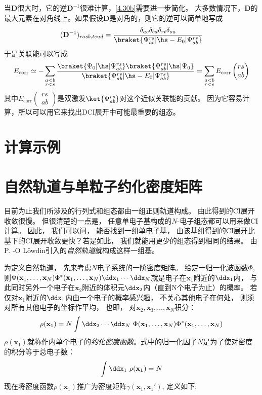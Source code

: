 当$\mathbf{D}$很大时，它的逆$\mathbf{D}^{-1}$很难计算，\autoref{4.30b}需要进一步简化。
大多数情况下，$\mathbf{D}$的最大元素在对角线上。如果假设$\mathbf{D}$是对角的，则它的逆可以简单地写成
\begin{align}
	(\mathbf{D}^{-1})_{rasb, tcud}=\frac{\delta_{ac}\delta_{bd}\delta_{rt}\delta_{su}}{\braket{\Psi^{rs}_{ab}|\hs-E_0|\Psi^{rs}_{ab}}}
\end{align}
于是关联能可以写成
\begin{align}
	E_{\text{corr}}\simeq -\sum_{\substack{a<b\\r<s}}\frac{\braket{\Psi_0|\hs|\Psi^{rs}_{ab}}\braket{\Psi^{rs}_{ab}|\hs|\Psi_0}}{\braket{\Psi^{rs}_{ab}|\hs-E_0|\Psi^{rs}_{ab}}}
	=\sum_{\substack{a<b\\r<s}}E_{\text{corr}}
	\begin{pmatrix}
		rs\\ab
	\end{pmatrix}
\end{align}
其中$E_{\text{corr}}
\begin{pmatrix}
	rs\\ab
\end{pmatrix}$是双激发$\ket{\Psi^{rs}_{ab}}$对这个近似关联能的贡献。
因为它容易计算，所以可以用它来找出DCI展开中可能最重要的组态。
\section{计算示例}\mbox{}
\label{sec4.3}
\section{自然轨道与单粒子约化密度矩阵}
\label{sec4.4}
目前为止我们所涉及的行列式和组态都由一组正则\hft 轨道构成。
由此得到的CI展开收敛很慢。
但很清楚的一点是，
任意单电子基构成的$N$-电子组态都可以用来做CI计算。
因此，
我们可以问，
能否找到一组单电子基，
由该基组得到的CI展开比\hft 基下的CI展开收敛更快？若是如此，
我们就能用更少的组态得到相同的结果。
由P.
-O L\"owdin引入的\emph{自然轨道}就构成这样一组基。


为定义自然轨道，
先来考虑$N$电子系统的一阶密度矩阵。
给定一归一化波函数$\Phi$, 
则$\Phi(\mathbf{x}_1,\ldots,\mathbf{x}_N)\Phi^*(\mathbf{x}_1,\ldots,\mathbf{x}_N)\ddx_1\cdots\ddx_N$就是电子在$\mathbf{x}_1$附近的$\ddx_1$内，
与此同时另外一个电子在$\mathbf{x}_2$附近的体积元$\ddx_2$内（直到N个电子为止）的概率。
若仅对$\mathbf{x}_1$附近的$\ddx_1$内由一个电子的概率感兴趣，
不关心其他电子在何处，
则须对所有其他电子的坐标作平均，
也即，
对$\mathbf{x}_2,\mathbf{x}_3,\ldots,\mathbf{x}_N$积分：
\begin{align}
\rho(\mathbf{x}_1) = N \int\ddx_2\cdots\ddx_N \,\, \Phi(\mathbf{x}_1,\ldots,\mathbf{x}_N)\Phi^*(\mathbf{x}_1,\ldots,\mathbf{x}_N)
\end{align}
$\rho(\mathbf{x}_1)$就称作内单个电子的\emph{约化密度函数}。式中的归一化因子$N$是为了使对密度的积分等于总电子数：
\begin{align}
\int\ddx_1\,\,\rho(\mathbf{x_1}) = N
\end{align}
现在将密度函数$\rho(\mathbf{x}_1)$推广为密度矩阵$\gamma(\mathbf{x}_1,\mathbf{x}_1')$, 
定义如下;

